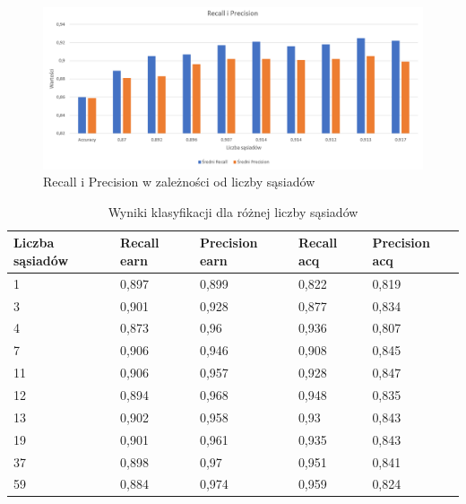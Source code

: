 \documentclass{classrep}
\begin{document}
{\begin{figure}[H]
\caption{Recall i Precision w zależności od liczby sąsiadów}
\centering
\includegraphics[width=1\textwidth]{i8}
\end{figure}

\begin{table}[h]
\begin{center}
\caption{Wyniki klasyfikacji dla różnej liczby sąsiadów}
\begin{tabular}{|l|l|l|l|l|}
\hline
\textbf{Liczba sąsiadów} & \textbf{Recall earn} & \textbf{Precision earn} & \textbf{Recall acq} & \textbf{Precision acq} \\ \hline
1                        & 0,897                & 0,899                   & 0,822               & 0,819                  \\ \hline
3                        & 0,901                & 0,928                   & 0,877               & 0,834                  \\ \hline
4                        & 0,873                & 0,96                    & 0,936               & 0,807                  \\ \hline
7                        & 0,906                & 0,946                   & 0,908               & 0,845                  \\ \hline
11                       & 0,906                & 0,957                   & 0,928               & 0,847                  \\ \hline
12                       & 0,894                & 0,968                   & 0,948               & 0,835                  \\ \hline
13                       & 0,902                & 0,958                   & 0,93                & 0,843                  \\ \hline
19                       & 0,901                & 0,961                   & 0,935               & 0,843                  \\ \hline
37                       & 0,898                & 0,97                    & 0,951               & 0,841                  \\ \hline
59                       & 0,884                & 0,974                   & 0,959               & 0,824                  \\ \hline
\end{tabular}
\end{center}
\end{table}

}
\end{document}

